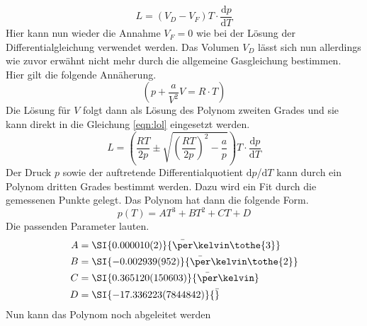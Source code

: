 \begin{equation}
    \label{eqn:lol}
L = (V_{D}-V_{F})T \cdot \frac{\text{d}p}{\text{d}T}
\end{equation}
Hier kann nun wieder die Annahme $V_{F} = 0$ wie bei der Lösung der Differentialgleichung verwendet werden. Das Volumen $V_{D}$ lässt sich nun allerdings wie zuvor erwähnt nicht mehr
durch die allgemeine Gasgleichung bestimmen. Hier gilt die folgende Annäherung.
\begin{equation}
\left( p + \frac{a}{V^{2}}V = R \cdot T \right)
\end{equation}
Die Lösung für $V$ folgt dann als Lösung des Polynom zweiten Grades und sie kann direkt in die Gleichung \eqref{eqn:lol} eingesetzt werden.
\begin{equation}
L = \left(\frac{RT}{2p} \pm \sqrt{\left( \frac{RT}{2p}\right)^2 -\frac{a}{p}}\right) T \cdot \frac{\text{d}p}{\text{d}T}
\end{equation}
Der Druck $p$ sowie der auftretende Differentialquotient $\text{d}p$/$\text{d}T$ kann durch ein Polynom dritten Grades bestimmt werden. Dazu wird ein
Fit durch die gemessenen Punkte gelegt. Das Polynom hat dann die folgende Form.
\begin{equation}
p(T) = AT^{3} + BT^{2} + CT + D
\end{equation}
Die passenden Parameter lauten.
\begin{align*}
    A &= \SI{0.000010(2)}{\bar\per\kelvin\tothe{3}} \\
    B &= \SI{-0.002939 (952)}{\bar\per\kelvin\tothe{2}} \\
    C &= \SI{0.365120 (150603)}{\bar\per\kelvin}\\
    D &=  \SI{-17.336223 (7844842)}{\bar} \\
\end{align*}
Nun kann das Polynom noch abgeleitet werden